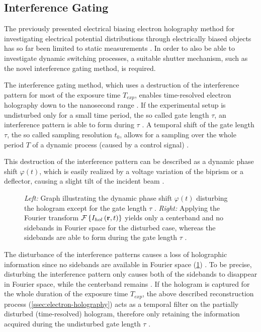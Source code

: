\subsection{Interference Gating} \label{ssec:igate}
The previously presented electrical biasing electron holography method for investigating electrical potential distributions through electrically biased objects has so far been limited to static measurements \cite{Niermann2017}. In order to also be able to investigate dynamic switching processes, a suitable shutter mechanism, such as the novel interference gating method, is required.

The interference gating method, which uses a destruction of the interference pattern for most of the exposure time $T_{exp}$, enables time-resolved electron holography down to the nanosecond range \cite{Niermann2017,Wagner2019}. If the experimental setup is undisturbed only for a small time period, the so called gate length $\tau$, an interference pattern is able to form during $\tau$ \cite{Niermann2017,Wagner2019}. A temporal shift of the gate length $\tau$, the so called sampling resolution $t_0$, allows for a sampling over the whole period $T$ of a dynamic process (caused by a control signal) \cite{Niermann2017,Wagner2019}.

This destruction of the interference pattern can be described as a dynamic phase shift $\varphi\left(t\right)$, which is easily realized by a voltage variation of the biprism \cite{Niermann2017} or a deflector, causing a slight tilt of the incident beam \cite{Wagner2019}.%
\begin{figure}[H]
	\centering
	\caption{\emph{Left:} Graph illustrating the dynamic phase shift $\varphi\left(t\right)$ disturbing the hologram except for the gate length $\tau$ \cite{Niermann2017,Wagner2019}. \emph{Right:} Applying the Fourier transform $\mathcal{F}\left\{ I_{hol}\left(\vb{r},t\right) \right\}$ yields only a centerband and no sidebands in Fourier space for the disturbed case, whereas the sidebands are able to form during the gate length $\tau$ \cite{Niermann2017,Wagner2019}.}
	\label{fig:igate}
\end{figure}
The disturbance of the interference patterns causes a loss of holographic information since no sidebands are available in Fourier space (\cref{fig:igate}) \cite{Niermann2017,Wagner2019}. To be precise, disturbing the interference pattern only causes both of the sidebands to disappear in Fourier space, while the centerband remains \cite{Niermann2017,Wagner2019}. If the hologram is captured for the whole duration of the exposure time $T_{exp}$, the above described reconstruction process (\cref{ssec:electron-holography}) acts as a temporal filter on the partially disturbed (time-resolved) hologram, therefore only retaining the information acquired during the undisturbed gate length $\tau$ \cite{Niermann2017,Wagner2019}.

